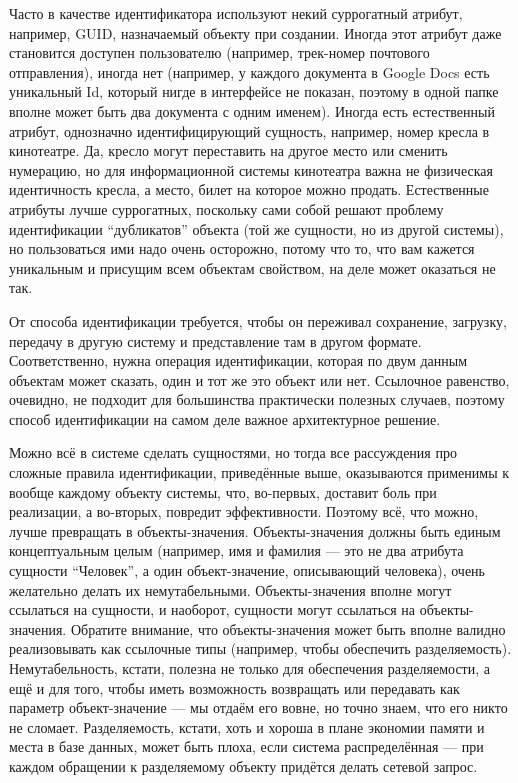 \documentclass[a5paper]{article}
\begin{document}
Часто в качестве идентификатора используют некий суррогатный атрибут, например, GUID, назначаемый объекту при создании. Иногда этот атрибут даже становится доступен пользователю (например, трек-номер почтового отправления), иногда нет (например, у каждого документа в Google Docs есть уникальный Id, который нигде в интерфейсе не показан, поэтому в одной папке вполне может быть два документа с одним именем). Иногда есть естественный атрибут, однозначно идентифицирующий сущность, например, номер кресла в кинотеатре. Да, кресло могут переставить на другое место или сменить нумерацию, но для информационной системы кинотеатра важна не физическая идентичность кресла, а место, билет на которое можно продать. Естественные атрибуты лучше суррогатных, поскольку сами собой решают проблему идентификации ``дубликатов'' объекта (той же сущности, но из другой системы), но пользоваться ими надо очень осторожно, потому что то, что вам кажется уникальным и присущим всем объектам свойством, на деле может оказаться не так.

От способа идентификации требуется, чтобы он переживал сохранение, загрузку, передачу в другую систему и представление там в другом формате. Соответственно, нужна операция идентификации, которая по двум данным объектам может сказать, один и тот же это объект или нет. Ссылочное равенство, очевидно, не подходит для большинства практически полезных случаев, поэтому способ идентификации на самом деле важное архитектурное решение.

Можно всё в системе сделать сущностями, но тогда все рассуждения про сложные правила идентификации, приведённые выше, оказываются применимы к вообще каждому объекту системы, что, во-первых, доставит боль при реализации, а во-вторых, повредит эффективности. Поэтому всё, что можно, лучше превращать в объекты-значения. Объекты-значения должны быть единым концептуальным целым (например, имя и фамилия --- это не два атрибута сущности ``Человек'', а один объект-значение, описывающий человека), очень желательно делать их немутабельными. Объекты-значения вполне могут ссылаться на сущности, и наоборот, сущности могут ссылаться на объекты-значения. Обратите внимание, что объекты-значения может быть вполне валидно реализовывать как ссылочные типы (например, чтобы обеспечить разделяемость). Немутабельность, кстати, полезна не только для обеспечения разделяемости, а ещё и для того, чтобы иметь возможность возвращать или передавать как параметр объект-значение --- мы отдаём его вовне, но точно знаем, что его никто не сломает. Разделяемость, кстати, хоть и хороша в плане экономии памяти и места в базе данных, может быть плоха, если система распределённая --- при каждом обращении к разделяемому объекту придётся делать сетевой запрос.
\end{document}
